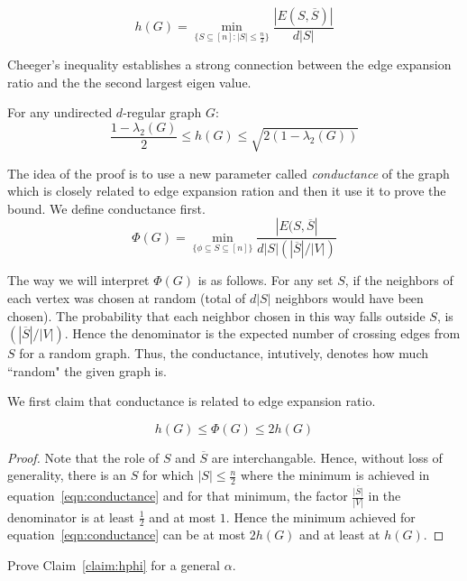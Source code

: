 $$h(G) = \min_{\{S \subseteq [n] :  
|S| \le \frac{n}{2}\}}\frac{|E(S,\overline{S})|}{d|S|}$$

Cheeger's inequality establishes a strong connection between the edge expansion ratio and the the second largest eigen value.

\begin{theorem}
\label{thm:Cheeger}
For any undirected $d$-regular graph $G$:
$$\frac{1-\lambda_2(G)}{2} \le h(G) \le \sqrt{2(1-\lambda_2(G))}$$
\end{theorem}


The idea of the proof is to use a new parameter called {\em conductance} of the graph which is closely related to edge expansion ration and then it use it to prove the bound. We define conductance first.
\begin{equation}
\Phi(G) = \min_{\{\phi \subseteq S \subseteq [n]\}} \frac{|E(S,\overline{S}|}{d|S|\left(|\overline{S}|/|V|\right)}
\label{eqn:conductance}
\end{equation}

The way we will interpret $\Phi(G)$ is as follows. For any set $S$, if the neighbors of each vertex was chosen at random (total of $d|S|$ neighbors would have been chosen). The probability that each neighbor chosen in this way falls outside $S$, is $\left(|\overline{S}|/|V|\right)$. Hence the denominator is the expected number of crossing edges from $S$ for a random graph. Thus, the conductance, intutively, denotes how much ``random" the given graph is.

We first claim that conductance is related to edge expansion ratio.
\begin{claim}
\label{claim:hphi}
$$h(G) \le \Phi(G) \le 2h(G)$$
\end{claim}
\begin{proof}
Note that the role of $S$ and $\overline{S}$ are interchangable. Hence, without loss of generality, there is an $S$ for which $|S| \le \frac{n}{2}$ where the minimum is achieved in equation~\ref{eqn:conductance} and for that minimum, the factor $\frac{\overline{|S|}}{|V|}$ in the denominator is at least $\frac{1}{2}$ and at most $1$. Hence the minimum achieved for equation~\ref{eqn:conductance} can be at most $2h(G)$ and at least at $h(G)$.
\end{proof}

\begin{exercise}
Prove Claim~\ref{claim:hphi} for a general $\alpha$.
\end{exercise}

